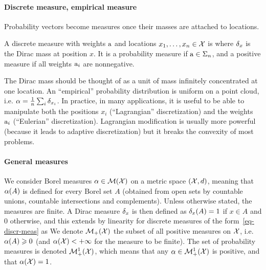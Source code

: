 \paragraph{Discrete measure, empirical measure}

Probability vectors become measures once their masses are attached to locations.

\begin{defn}\label{def-discrete-measure}
	A discrete measure with weights $\mathrm{a}$ and locations $x_1,\dots,x_n\in\mathcal{X}$ is
	where $\delta_x$ is the Dirac mass at position $x$. It is a probability measure if $\mathrm{a}\in\Sigma_n$, and a positive measure if all weights $\mathrm{a}_i$ are nonnegative.
\end{defn}
The Dirac mass should be thought of as a unit of mass infinitely concentrated at one location.
%
An ``empirical'' probability distribution is uniform on a point cloud, i.e. $\alpha=\frac{1}{n}\sum_i \delta_{x_i}$.
%
In practice, in many applications, it is useful to be able to manipulate both the positions $x_i$ (``Lagrangian'' discretization) and the weights $\mathrm{a}_i$ (``Eulerian'' discretization). Lagrangian modification is usually more powerful (because it leads to adaptive discretization) but it breaks the convexity of most problems.


\paragraph{General measures}

We consider Borel measures $\alpha \in \mathcal{M}(\mathcal{X})$ on a metric space $(\mathcal{X},d)$, meaning that $\alpha(A)$ is defined for every Borel set $A$ (obtained from open sets by countable unions, countable intersections and complements). Unless otherwise stated, the measures are finite.
%
A Dirac measure $\delta_x$ is then defined as $\delta_x(A)=1$ if $x \in A$ and $0$ otherwise, and this extends by linearity for discrete measures of the form~\eqref{eq-discr-meas} as
%
We denote $\mathcal{M}_+(\mathcal{X})$ the subset of all positive measures on $\mathcal{X}$, i.e. $\alpha(A) \geqslant 0$ (and $\alpha(\mathcal{X})<+\infty$ for the measure to be finite). The set of probability measures is denoted $\mathcal{M}_+^1(\mathcal{X})$, which means that any $\alpha \in \mathcal{M}_+^1(\mathcal{X})$ is positive, and that $\alpha(\mathcal{X})=1$.


